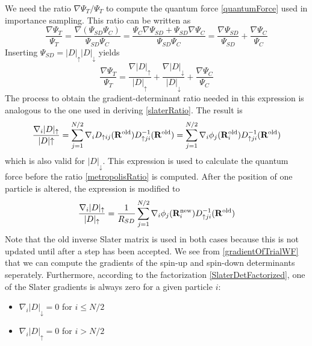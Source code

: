 \documentclass[english, a4paper]{article}
\begin{document}
We need the ratio $\nabla \Psi_T/\Psi_T$ to compute the quantum force \eqref{quantumForce}
used in importance sampling. This ratio can be written as
\begin{equation}
 \frac{\nabla \Psi_T}{\Psi_T} = \frac{\nabla (\Psi_{SD}\Psi_C)}{\Psi_{SD}\Psi_C} = 
 \frac{\Psi_{C}\nabla\Psi_{SD} + \Psi_{SD}\nabla\Psi_C}{\Psi_{SD}\Psi_C} = 
 \frac{\nabla \Psi_{SD}}{\Psi_{SD}} + \frac{\nabla \Psi_C}{\Psi_C}
\end{equation}
Inserting $\Psi_{SD} = |D|_\uparrow|D|_\downarrow$ yields
\begin{equation}
 \frac{\nabla \Psi_T}{\Psi_T} = \frac{\nabla|D|_\uparrow}{|D|_\uparrow} + 
 \frac{\nabla |D|_\downarrow}{|D|_\downarrow} + \frac{\nabla \Psi_C}{\Psi_C}
 \label{gradientOfTrialWF}
\end{equation}
The process to obtain the gradient-determinant ratio needed in this expression is analogous to
the one used in deriving \eqref{slaterRatio}. The result is
\begin{equation}
 \frac{\nabla_i |D|_{\uparrow}}{|D|{\uparrow}} = \sum_{j=1}^{N/2} \nabla_i D_{\uparrow ij}
 ({\bf R}^{\textrm{old}}) D_{\uparrow ji}^{-1}
 ({\bf R}^{\textrm{old}})
        = \sum_{j=1}^{N/2}\nabla_i \phi_j({\bf R}_i^{\textrm{old}}) D_{\uparrow ji}^{-1}({\bf R}^{\textrm{old}})
        \label{gradientRatioBefore}
\end{equation}
which is also valid for $|D|_\downarrow$. 
This expression is used to calculate the quantum force before the ratio \eqref{metropolisRatio} is computed. 
After the position of one particle is altered, the expression is modified to
\begin{equation}
 \frac{\nabla_i |D|_{\uparrow}}{|D|_{\uparrow}}
        = \frac{1}{R_{SD}} \sum_{j=1}^{N/2} \nabla_i \phi_j({\bf R}_i^{\textrm{new}}) 
        D_{\uparrow ji}^{-1}({\bf R}^{\textrm{old}})
        \label{gradientRatioAfter}
\end{equation}
Note that the old inverse Slater matrix is used in both cases because this is not updated until after 
a step has been accepted. We see from \eqref{gradientOfTrialWF} that we can compute
the gradients of the spin-up and spin-down determinants seperately. Furthermore, according to 
the factorization \eqref{SlaterDetFactorized},
one of the Slater gradients is always zero for a given particle $i$:
\begin{itemize}
 \item $\nabla_i |D|_\downarrow = 0$  for $i \leq N/2$
 \item $\nabla_i |D|_\uparrow = 0$ for $i > N/2$
\end{itemize}
\end{document}

